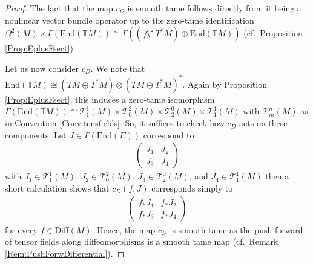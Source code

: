 \documentclass[10pt,a4paper]{amsart}
\newcommand{\Diff}{\mathrm{Diff}(M)}
\newcommand{\Forms}[1]{\Omega^{#1}(M)}
\newcommand{\GenTM}{\mathbb TM}
\newcommand{\tens}{\otimes}
\newcommand{\tensf}[2]{\mathcal{T}^{#1}_{#2}(M)}
\begin{document}
\begin{proof}
The fact that the map $c_\Omega$ is smooth tame follows directly from it being a nonlinear vector bundle operator up to the zero-tame identification 
$\Forms{2}\times \Gamma(\mathrm{End}(\GenTM))\cong \Gamma((\bigwedge^2T^*M)\oplus\mathrm{End}(\GenTM))$ (cf.~Proposition \ref{Prop:EplusFsect}).

Let us now consider $c_D$. We note that $\mathrm{End}(\GenTM)\cong (TM\oplus T^*M)\tens (TM\oplus T^*M)^*$. Again by Proposition \ref{Prop:EplusFsect}, this induces a zero-tame isomorphism
$\Gamma(\mathrm{End}(\GenTM))\cong \tensf{1}{1}\times \tensf{2}{0}\times \tensf{0}{2}\times \tensf{1}{1}$ with $\tensf{n}{m}$ as in Convention \ref{Conv:tensfields}. So, it suffices to check how $c_D$ acts on these components. Let $J\in \Gamma(\mathrm{End}(E))$ correspond to
\begin{align*}
    \begin{pmatrix}
        J_1 & J_2\\
        J_3 & J_4
\end{pmatrix}
\end{align*}
with $J_1\in \tensf{1}{1}$, $J_2\in \tensf{2}{0}$, $J_3\in \tensf{0}{2}$, and $J_4\in \tensf{1}{1}$ then a short calculation shows that $c_D(f,J)$ corresponds simply to
\begin{align*}
    \begin{pmatrix}
        f_*J_1 & f_*J_2\\
        f_*J_3 & f_*J_4
\end{pmatrix}
\end{align*}
for every $f\in \Diff$. Hence, the map $c_D$ is smooth tame as the push forward of tensor fields along diffeomorphisms is a smooth tame map (cf.~Remark \ref{Rem:PushForwDifferential}).
\end{proof}
\end{document}
